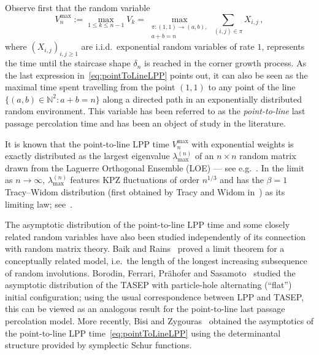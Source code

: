 \documentclass[a4paper,reqno,12pt]{amsart}
\theoremstyle{plain}
\theoremstyle{definition}
\newcommand{\N}{\mathbb{N}}
\newcommand{\1}{\mathbbm{1}}
\begin{document}
Observe first that the random variable
\begin{equation}
\label{eq:pointToLineLPP}
V^{\max}_n := \max_{1\leq k\leq n-1} V_k = \max_{\substack{\pi \colon (1,1)\to (a,b), \\ a+b=n}} \sum_{(i,j)\in \pi} X_{i,j} \, ,
\end{equation}
where $(X_{i,j})_{i,j\ge 1}$ are i.i.d.\ exponential random variables of rate $1$, represents the time until the staircase shape $\delta_n$ is reached in the corner growth process.
As the last expression in~\eqref{eq:pointToLineLPP} points out, it can also be seen as the maximal time spent travelling from the point $(1,1)$ to any point of the line $\{(a,b)\in \N^2\colon a+b = n\}$ along a directed path in an exponentially distributed random environment.
This variable has been referred to as the \emph{point-to-line} last passage percolation time and has been an object of study in the literature.

It is known that the point-to-line LPP time $V^{\max}_n$ with exponential weights is exactly distributed as the largest eigenvalue $\lambda^{(n)}_{\max}$ of an $n\times n$ random matrix drawn from the Laguerre Orthogonal Ensemble (LOE) --- see e.g.~\cite{baikRains01a, fitzgeraldWarren20}.
In the limit as $n\to\infty$, $\lambda^{(n)}_{\max}$ features KPZ fluctuations of order $n^{1/3}$ and has the $\beta=1$ Tracy--Widom distribution (first obtained by Tracy and Widom in~\cite{tracyWidom96}) as its limiting law; see~\cite[Theorem~1.1]{johnstone01}.

The asymptotic distribution of the point-to-line LPP time and some closely related random variables have also been studied independently of its connection with random matrix theory.
Baik and Rains~\cite{baikRains01b} proved a limit theorem for a conceptually related model, 
i.e.\ the length of the longest increasing subsequence of random involutions.
Borodin, Ferrari, Pr\"ahofer and Sasamoto~\cite{sasamoto05, borodinFerrariPrahoferSasamoto07} studied the asymptotic distribution of the TASEP with particle-hole alternating (``flat'') initial configuration; using the usual correspondence between LPP and TASEP, this can be viewed as an analogous result for the point-to-line last passage percolation model.
More recently, Bisi and Zygouras~\cite[Theorem~1.1]{bisiZygouras19b} obtained the asymptotics of the point-to-line LPP time~\eqref{eq:pointToLineLPP} using the determinantal structure provided by symplectic Schur functions.
\end{document}
